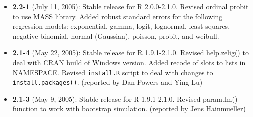 \documentclass[oneside,letterpaper,12pt]{book}
\begin{document}
\begin{itemize}
\item \textbf{2.2-1} (July 11, 2005):  Stable release for R 2.0.0-2.1.0.  
Revised ordinal probit to use MASS library.  Added robust standard errors 
for the following regression models: exponential, gamma, logit, lognormal, 
least squares, negative binomial, normal (Gaussian), poisson, probit, and 
weibull.

\item \textbf{2.1-4} (May 22, 2005):  Stable release for R 1.9.1-2.1.0.  Revised help.zelig()
  to deal with CRAN build of Windows version.  Added recode of slots to lists    
  in NAMESPACE.  Revised {\tt install.R} script to deal with changes to {\tt install.packages()}.  (reported by Dan Powers and 
Ying Lu)

\item \textbf{2.1-3} (May 9, 2005):  Stable release for R 1.9.1-2.1.0.  
Revised param.lm() function to work with bootstrap simulation.  (reported 
by Jens Hainmueller)


\end{itemize}
\end{document}
